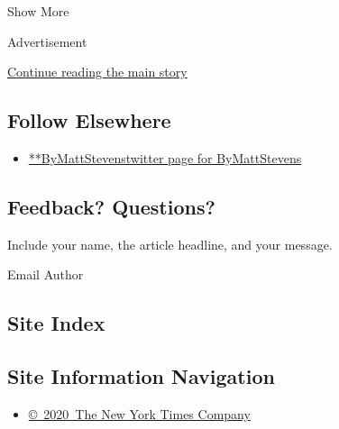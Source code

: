 Show More

Advertisement

\protect\hyperlink{after-mid2}{Continue reading the main story}

\hypertarget{follow-elsewhere}{%
\subsection{Follow Elsewhere}\label{follow-elsewhere}}

\begin{itemize}
\tightlist
\item
  \href{https://twitter.com/ByMattStevens}{**ByMattStevenstwitter page
  for ByMattStevens}
\end{itemize}

\hypertarget{feedback-questions}{%
\subsection{Feedback? Questions?}\label{feedback-questions}}

Include your name, the article headline, and your message.

Email Author

\hypertarget{site-index}{%
\subsection{Site Index}\label{site-index}}

\hypertarget{site-information-navigation}{%
\subsection{Site Information
Navigation}\label{site-information-navigation}}

\begin{itemize}
\tightlist
\item
  \href{https://help.nytimes3xbfgragh.onion/hc/en-us/articles/115014792127-Copyright-notice}{©~2020~The
  New York Times Company}
\end{itemize}

